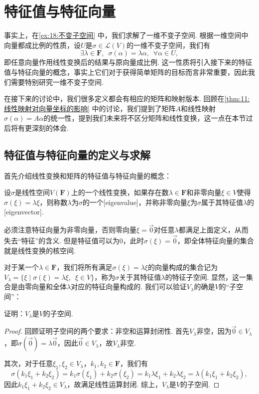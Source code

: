 \section{特征值与特征向量}

事实上，在\autoref{ex:18:不变子空间} 中，我们求解了一维不变子空间. 根据一维空间中向量都成比例的性质，设$U$是$\sigma\in\mathcal{L}(V)$的一维不变子空间，我们有
\[\exists\lambda\in\mathbf{F},\enspace\sigma(\alpha)=\lambda\alpha,\enspace\forall \alpha\in U,\]
即任意向量作用线性变换后的结果与原向量成比例. 这一性质将引入接下来的特征值与特征向量的概念，事实上它们对于获得简单矩阵的目标而言非常重要，因此我们需要特别研究一维不变子空间.

在接下来的讨论中，我们很多定义都会有相应的矩阵和映射版本. 回顾在\autoref{thm:11:线性映射对向量坐标的影响} 中的讨论，我们提到了矩阵$A$和线性映射$\sigma(\alpha)=A\alpha$的统一性，提到我们未来将不区分矩阵和线性变换，这一点在本节过后将有更深刻的体会.

\subsection{特征值与特征向量的定义与求解}

首先介绍线性变换和矩阵的特征值与特征向量的概念：
\begin{definition}
    设$\sigma$是线性空间$V(\mathbf{F})$上的一个线性变换，如果存在数$\lambda\in\mathbf{F}$和非零向量$\xi\in V$使得$\sigma(\xi)=\lambda\xi$，则称数$\lambda$为$\sigma$的一个[eigenvalue]，并称非零向量$\xi$为$\sigma$属于其特征值$\lambda$的[eigenvector].
\end{definition}
必须注意特征向量为非零向量，否则零向量$\xi=\vec{0}$对任意$\lambda$都满足上面定义，从而失去``特征''的含义. 但是特征值可以为0，此时$\sigma(\xi)=\vec{0}$，即全体特征向量的集合就是线性变换的核空间.

对于某一个$\lambda\in\mathbf{F}$，我们将所有满足$\sigma(\xi)=\lambda\xi$的向量构成的集合记为$V_\lambda=\{\xi \mid \sigma(\xi)=\lambda\xi,\enspace\xi\in V\}$，称为$\sigma$关于其特征值$\lambda$的特征子空间. 显然，这一集合是由零向量和全体$\lambda$对应的特征向量构成的. 我们可以验证$V_\lambda$的确是$V$的``子空间''：
\begin{example}
    证明：$V_\lambda$是$V$的子空间.
\end{example}

\begin{proof}
    回顾证明子空间的两个要求：非空和运算封闭性. 首先$V_\lambda$非空，因为$\vec{0}\in V_\lambda$，即$\sigma(\vec{0})=\lambda\vec{0}$，因此$\vec{0}\in V_\lambda$，故$V_\lambda$非空.

    其次，对于任意$\xi_1,\xi_2\in V_\lambda$，$k_1,k_2\in\mathbf{F}$，我们有
    \[\sigma(k_1\xi_1+k_2\xi_2)=k_1\sigma(\xi_1)+k_2\sigma(\xi_2)=k_1\lambda\xi_1+k_2\lambda\xi_2=\lambda(k_1\xi_1+k_2\xi_2),\]
    因此$k_1\xi_1+k_2\xi_2\in V_\lambda$，故满足线性运算封闭. 综上，$V_\lambda$是$V$的子空间.
\end{proof}


